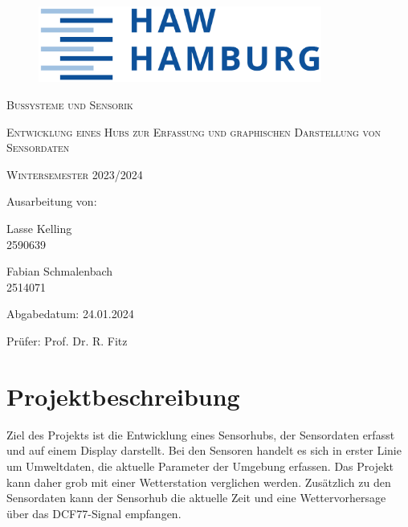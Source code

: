 \documentclass[a4paper,11pt]{article}
\begin{document}
\begin{titlepage}

  \begin{figure}
    \centering
    \includegraphics[height=2.5cm]{HAWLogo}
  \end{figure}

  \vspace*{2cm}
  \centering
  {\scshape\Large Bussysteme und Sensorik \par}
  \vspace{1cm}
  {\scshape\LARGE Entwicklung eines Hubs zur Erfassung und graphischen Darstellung von Sensordaten \par}
  \vspace{0.5cm}
  {\scshape\large Wintersemester 2023/2024 \par}
  \vspace{5cm}

  \raggedright
  Ausarbeitung von:

  \vspace{0.5cm}
  Lasse Kelling \\
  2590639

  \vspace{0.2cm}
  Fabian Schmalenbach \\
  2514071

  \vspace{0.5cm}
  Abgabedatum: 24.01.2024

  \vspace{0.5cm}
  Prüfer: Prof. Dr. R. Fitz



\end{titlepage}

\newpage
{}
\tableofcontents
\thispagestyle{empty}
\newpage

\setcounter{page}{1}    %

\section{Projektbeschreibung}
\label{sub:projektbeschreibung}

Ziel des Projekts ist die Entwicklung eines Sensorhubs, der Sensordaten erfasst und auf einem Display darstellt.
Bei den Sensoren handelt es sich in erster Linie um Umweltdaten, die aktuelle Parameter der Umgebung erfassen.
Das Projekt kann daher grob mit einer Wetterstation verglichen werden. Zusätzlich zu den Sensordaten kann der Sensorhub
die aktuelle Zeit und eine Wettervorhersage über das DCF77-Signal empfangen. 
\end{document}
